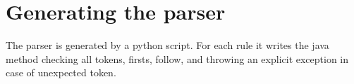 \section{Generating the parser}

The parser is generated by a python script. For each rule it writes the java method checking all tokens, firsts, follow, and throwing an explicit exception in case of unexpected token.





